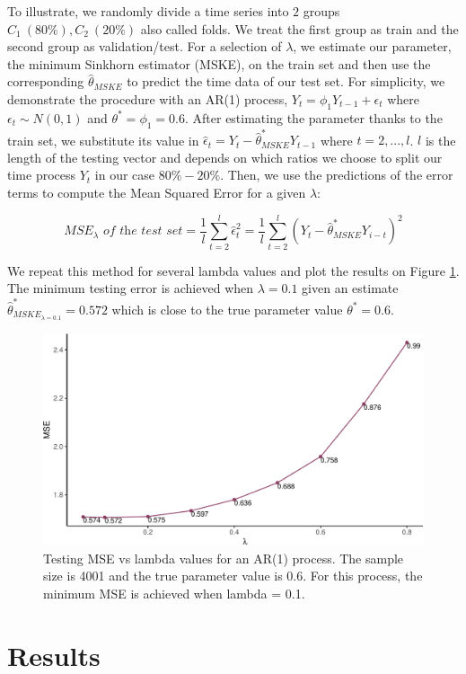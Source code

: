 \documentclass[
  11pt,
]{article}
\begin{document}
To illustrate, we randomly divide a time series into \(2\) groups
\(C_1 \ (80\%), C_2 \ (20\%)\) also called folds. We treat the first
group as train and the second group as validation/test. For a selection
of \(\lambda\), we estimate our parameter, the minimum Sinkhorn
estimator (MSKE), on the train set and then use the corresponding
\(\hat \theta_{MSKE}\) to predict the time data of our test set. For
simplicity, we demonstrate the procedure with an AR(1) process,
\(Y_t = \phi_1 Y_{t-1} + \epsilon_t\) where \(\epsilon_t \sim N(0,1)\)
and \(\theta^* = \phi_1 = 0.6\). After estimating the parameter thanks
to the train set, we substitute its value in
\(\hat \epsilon_t = Y_t - \hat \theta^*_{MSKE} Y_{t-1}\) where
\(t = 2, ..., l\). \(l\) is the length of the testing vector and depends
on which ratios we choose to split our time process \({Y_t}\) in our
case \(80\% - 20\%\). Then, we use the predictions of the error terms to
compute the Mean Squared Error for a given \(\lambda\):

\[MSE_{\lambda} \textit{ of the test set} = \frac{1}{l}\sum_{t = 2}^l \hat \epsilon_t^2 = \frac{1}{l} \sum_{t = 2}^l (Y_t - \hat \theta^*_{MSKE} Y_{i-t})^2\]

We repeat this method for several lambda values and plot the results on
Figure \ref{fig:SH_CV}. The minimum testing error is achieved when
\(\lambda = 0.1\) given an estimate
\(\hat \theta^*_{MSKE_{\lambda = 0.1}} = 0.572\) which is close to the
true parameter value \(\theta^* = 0.6\).

\begin{figure}

{\centering \includegraphics[width=0.55\linewidth]{Master_thesis_V2_files/figure-latex/SH_CV-1} 

}

\caption{Testing MSE vs lambda values for an AR(1) process. The sample size is  4001 and the true parameter value is 0.6. For this process, the minimum MSE is achieved when lambda = 0.1.}\label{fig:SH_CV}
\end{figure}

\hypertarget{results}{%
\section{Results}\label{results}}
\end{document}
